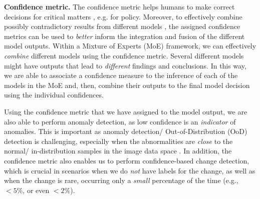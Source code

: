 \iffalse     
In addition, for benchmarking and comparing EO FMs, a single combined evaluation metric has to include the performance accuracy on different \textit{diverse} downstream tasks, also including in the evaluation metric how diverse  
these use cases are, the number of labeled data in the $n$-shot downstream tasks, confidence quantification and assessment, the number of model weights retrained 
and the training epochs needed for convergence. 
\fi 



\textbf{Confidence metric.}   
The confidence metric helps humans to make correct decisions for critical matters \cite{Confquantification4, UQpaperforreggression, paperexplainabiityai1}, e.g. for policy.      
Moreover, to effectively combine possibly contradictory results from different models \cite{Confquantification1}, the assigned confidence metrics can be used to \textit{better}       inform the integration and fusion of the different model outputs.      
Within a Mixture of Experts (MoE) framework, we can effectively \textit{combine} different models using the confidence metric.     
Several different models might have outputs that lead to \textit{different} findings and conclusions.         
In this way, we are able to associate a confidence measure to the inference of each of the models in the MoE and, then, combine their outputs to the final model decision using the individual confidences.

Using the confidence metric that we have assigned to the model output, we are also able to perform anomaly detection, as low confidence is an \textit{indicator} of anomalies.       
This is important as anomaly detection/ Out-of-Distribution (OoD) detection is challenging, especially when the abnormalities are \textit{close} to the normal/ in-distribution samples in the image data space \cite{ADandOoD1, ADandOoD2}.               
In addition, the confidence metric also enables us to perform confidence-based change detection, which is crucial in scenarios when we do \textit{not} have labels for the change, as well as when the change is rare, occurring only a \textit{small} percentage of the time (e.g., $<5\%$, or even $<2\%$).





